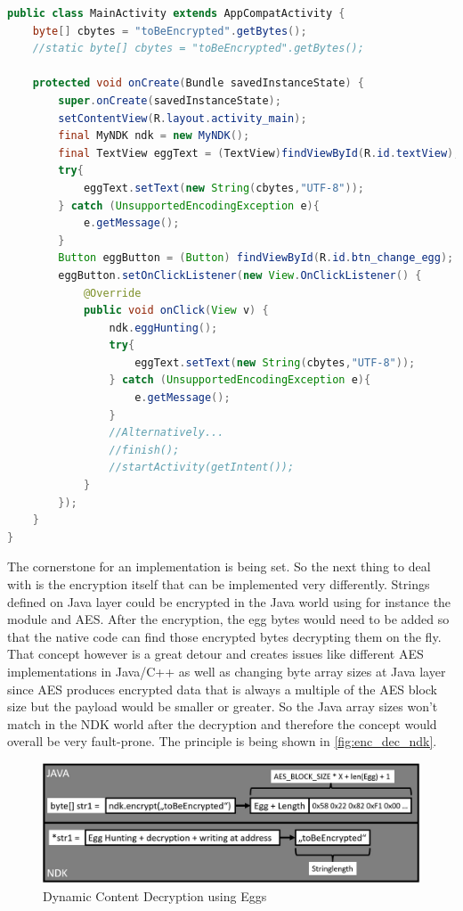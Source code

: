 \begin{lstlisting}[language=Java, caption=Native Code String Change, label=native_string_change]
public class MainActivity extends AppCompatActivity {
    byte[] cbytes = "toBeEncrypted".getBytes();
    //static byte[] cbytes = "toBeEncrypted".getBytes();

    protected void onCreate(Bundle savedInstanceState) {
        super.onCreate(savedInstanceState);
        setContentView(R.layout.activity_main);
        final MyNDK ndk = new MyNDK();
        final TextView eggText = (TextView)findViewById(R.id.textView);
        try{
            eggText.setText(new String(cbytes,"UTF-8"));
        } catch (UnsupportedEncodingException e){
            e.getMessage();
        }
        Button eggButton = (Button) findViewById(R.id.btn_change_egg);
        eggButton.setOnClickListener(new View.OnClickListener() {
            @Override
            public void onClick(View v) {
                ndk.eggHunting();
                try{
                    eggText.setText(new String(cbytes,"UTF-8"));
                } catch (UnsupportedEncodingException e){
                    e.getMessage();
                }
                //Alternatively...
                //finish();
                //startActivity(getIntent());
            }
        });
    }
}
\end{lstlisting}
The cornerstone for an implementation is being set.
So the next thing to deal with is the encryption itself that can be
implemented very differently. Strings defined on Java layer could be
encrypted in the Java world using for instance the 
module and AES. After the encryption, the egg bytes would need to
be added so that the native code can find those encrypted bytes
decrypting them on the fly. That concept however is a great detour and
creates issues like different AES implementations in Java/C++ as well as
changing byte array sizes at Java layer since AES produces encrypted data
that is always a multiple of the AES block size but the payload would be
smaller or greater. So the Java array sizes won't match in the NDK world
after the decryption and therefore the concept would overall be very fault-prone. The principle is being shown in \autoref{fig:enc_dec_ndk}.
\begin{figure}[htb]
  \centering
  \includegraphics[scale=0.4]{figures/enc_dec_ndk}
  \caption[Dynamic Content Decryption using Eggs]{Dynamic Content Decryption using Eggs}
  \label{fig:enc_dec_ndk}
\end{figure}


